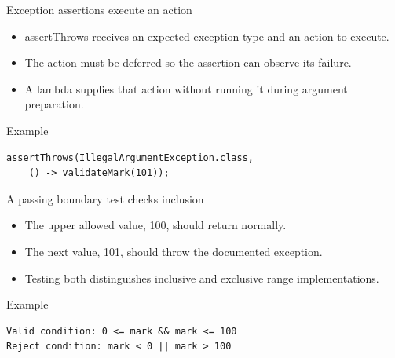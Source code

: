 \documentclass[10pt,aspectratio=169]{beamer}
\begin{document}
\begin{frame}[fragile,t]{Exception assertions execute an action}
\begin{itemize}
\item assertThrows receives an expected exception type and an action to execute.
\item The action must be deferred so the assertion can observe its failure.
\item A lambda supplies that action without running it during argument preparation.
\end{itemize}
\vspace{1mm}\begin{block}{Example}
\begin{lstlisting}
assertThrows(IllegalArgumentException.class,
    () -> validateMark(101));
\end{lstlisting}
\end{block}
\end{frame}

\begin{frame}[fragile,t]{A passing boundary test checks inclusion}
\begin{itemize}
\item The upper allowed value, 100, should return normally.
\item The next value, 101, should throw the documented exception.
\item Testing both distinguishes inclusive and exclusive range implementations.
\end{itemize}
\vspace{1mm}\begin{block}{Example}
\begin{lstlisting}
Valid condition: 0 <= mark && mark <= 100
Reject condition: mark < 0 || mark > 100
\end{lstlisting}
\end{block}
\end{frame}
\end{document}
